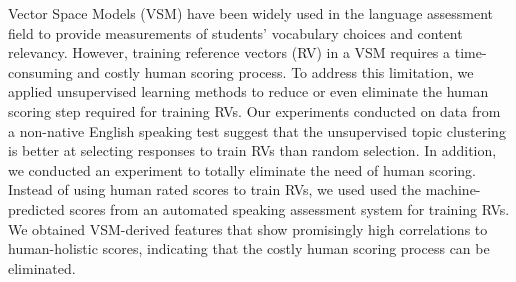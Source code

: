 Vector Space Models (VSM) have been widely used in the language assessment field
 to provide measurements of students' vocabulary choices and content
 relevancy. However, training reference vectors (RV) in a VSM requires a
 time-consuming and costly human scoring process. To address this limitation, we
 applied unsupervised learning methods to reduce or even eliminate the human
 scoring step required for training RVs. Our experiments conducted on data from
 a non-native English speaking test suggest that the unsupervised topic
 clustering is better at selecting  responses to train RVs than random
 selection. In addition, we conducted an experiment to totally eliminate the
 need of human scoring. Instead of using human rated scores to train RVs, we
 used used the machine-predicted scores from an automated speaking assessment
 system for training RVs. We obtained VSM-derived features that show promisingly
 high correlations to human-holistic scores, indicating that the costly human
 scoring process can be eliminated.


